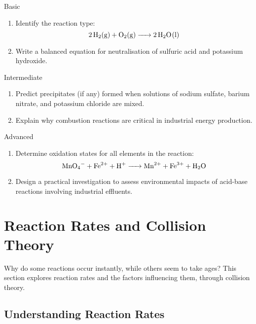 \FloatBarrier

\begin{tieredquestions}{Basic}
\begin{enumerate}
    \item Identify the reaction type: 
    \[
    \ce{2H2(g) + O2(g) -> 2H2O(l)}
    \]
    \item Write a balanced equation for neutralisation of sulfuric acid and potassium hydroxide.
\end{enumerate}
\end{tieredquestions}

\begin{tieredquestions}{Intermediate}
\begin{enumerate}
    \item Predict precipitates (if any) formed when solutions of sodium sulfate, barium nitrate, and potassium chloride are mixed.
    \item Explain why combustion reactions are critical in industrial energy production.
\end{enumerate}
\end{tieredquestions}

\begin{tieredquestions}{Advanced}
\begin{enumerate}
    \item Determine oxidation states for all elements in the reaction:
    \[
    \ce{MnO4^- + Fe^{2+} + H+ -> Mn^{2+} + Fe^{3+} + H2O}
    \]
    \item Design a practical investigation to assess environmental impacts of acid-base reactions involving industrial effluents.
\end{enumerate}
\end{tieredquestions}

\section{Reaction Rates and Collision Theory}
\FloatBarrier
\FloatBarrier
\FloatBarrier

Why do some reactions occur instantly, while others seem to take ages? This section explores reaction rates and the factors influencing them, through collision theory.

\subsection{Understanding Reaction Rates}
\FloatBarrier
\FloatBarrier
\FloatBarrier

